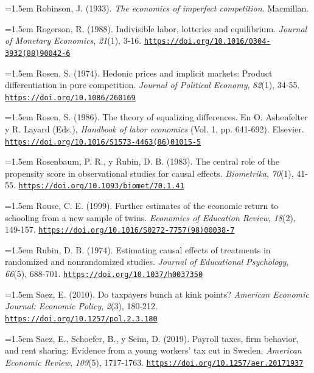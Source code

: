 \documentclass[10pt,a4paper]{article}
\begin{document}
\noindent\hangindent=1.5em Robinson, J. (1933). \textit{The economics of imperfect competition}. Macmillan.

\noindent\hangindent=1.5em Rogerson, R. (1988). Indivisible labor, lotteries and equilibrium. \textit{Journal of Monetary Economics}, \textit{21}(1), 3-16. \href{https://doi.org/10.1016/0304-3932(88)90042-6}{\nolinkurl{https://doi.org/10.1016/0304-3932(88)90042-6}}

{\sloppy\noindent\hangindent=1.5em Rosen, S. (1974). Hedonic prices and implicit markets: Product differentiation in pure competition. \textit{Journal of Political Economy}, \textit{82}(1), 34-55. \href{https://doi.org/10.1086/260169}{\nolinkurl{https://doi.org/10.1086/260169}}\par}

\noindent\hangindent=1.5em Rosen, S. (1986). The theory of equalizing differences. En O. Ashenfelter y R. Layard (Eds.), \textit{Handbook of labor economics} (Vol. 1, pp. 641-692). Elsevier. \href{https://doi.org/10.1016/S1573-4463(86)01015-5}{\nolinkurl{https://doi.org/10.1016/S1573-4463(86)01015-5}}

\noindent\hangindent=1.5em Rosenbaum, P. R., y Rubin, D. B. (1983). The central role of the propensity score in observational studies for causal effects. \textit{Biometrika}, \textit{70}(1), 41-55. \href{https://doi.org/10.1093/biomet/70.1.41}{\nolinkurl{https://doi.org/10.1093/biomet/70.1.41}}

\noindent\hangindent=1.5em Rouse, C. E. (1999). Further estimates of the economic return to schooling from a new sample of twins. \textit{Economics of Education Review}, \textit{18}(2), 149-157. \href{https://doi.org/10.1016/S0272-7757(98)00038-7}{\nolinkurl{https://doi.org/10.1016/S0272-7757(98)00038-7}}

\noindent\hangindent=1.5em Rubin, D. B. (1974). Estimating causal effects of treatments in randomized and nonrandomized studies. \textit{Journal of Educational Psychology}, \textit{66}(5), 688-701. \href{https://doi.org/10.1037/h0037350}{\nolinkurl{https://doi.org/10.1037/h0037350}}

\noindent\hangindent=1.5em Saez, E. (2010). Do taxpayers bunch at kink points? \textit{American Economic Journal: Economic Policy}, \textit{2}(3), 180-212. \href{https://doi.org/10.1257/pol.2.3.180}{\nolinkurl{https://doi.org/10.1257/pol.2.3.180}}

\noindent\hangindent=1.5em Saez, E., Schoefer, B., y Seim, D. (2019). Payroll taxes, firm behavior, and rent sharing: Evidence from a young workers' tax cut in Sweden. \textit{American Economic Review}, \textit{109}(5), 1717-1763. \href{https://doi.org/10.1257/aer.20171937}{\nolinkurl{https://doi.org/10.1257/aer.20171937}}
\end{document}
